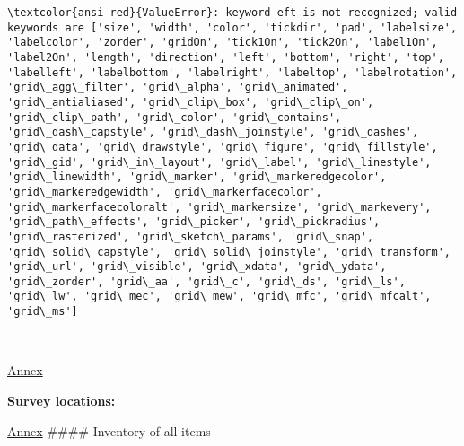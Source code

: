 \documentclass[11pt]{article}
\begin{document}
\begin{Verbatim}[commandchars=\\\{\}, frame=single, framerule=2mm, rulecolor=\color{outerrorbackground}]
\textcolor{ansi-red}{ValueError}: keyword eft is not recognized; valid keywords are ['size', 'width', 'color', 'tickdir', 'pad', 'labelsize', 'labelcolor', 'zorder', 'gridOn', 'tick1On', 'tick2On', 'label1On', 'label2On', 'length', 'direction', 'left', 'bottom', 'right', 'top', 'labelleft', 'labelbottom', 'labelright', 'labeltop', 'labelrotation', 'grid\_agg\_filter', 'grid\_alpha', 'grid\_animated', 'grid\_antialiased', 'grid\_clip\_box', 'grid\_clip\_on', 'grid\_clip\_path', 'grid\_color', 'grid\_contains', 'grid\_dash\_capstyle', 'grid\_dash\_joinstyle', 'grid\_dashes', 'grid\_data', 'grid\_drawstyle', 'grid\_figure', 'grid\_fillstyle', 'grid\_gid', 'grid\_in\_layout', 'grid\_label', 'grid\_linestyle', 'grid\_linewidth', 'grid\_marker', 'grid\_markeredgecolor', 'grid\_markeredgewidth', 'grid\_markerfacecolor', 'grid\_markerfacecoloralt', 'grid\_markersize', 'grid\_markevery', 'grid\_path\_effects', 'grid\_picker', 'grid\_pickradius', 'grid\_rasterized', 'grid\_sketch\_params', 'grid\_snap', 'grid\_solid\_capstyle', 'grid\_solid\_joinstyle', 'grid\_transform', 'grid\_url', 'grid\_visible', 'grid\_xdata', 'grid\_ydata', 'grid\_zorder', 'grid\_aa', 'grid\_c', 'grid\_ds', 'grid\_ls', 'grid\_lw', 'grid\_mec', 'grid\_mew', 'grid\_mfc', 'grid\_mfcalt', 'grid\_ms']
    \end{Verbatim}

    \begin{center}
    \end{center}
    { \hspace*{\fill} \\}
    
    \hyperref[annex]{Annex}

\textbf{Survey locations:}

    \hyperref[annex]{Annex} \#\#\#\# Inventory of all items


    
    
    
\end{document}
